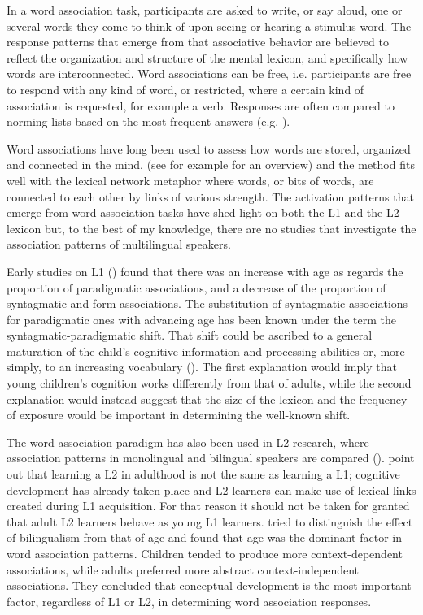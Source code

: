 \documentclass[output=paper,colorlinks,citecolor=brown,nonflat]{langsci/langscibook}
\begin{document}
In a word association task, participants are asked to write, or say aloud, one or several words they come to think of upon seeing or hearing a stimulus word. The response patterns that emerge from that associative behavior are believed to reflect the organization and structure of the mental lexicon, and specifically how words are interconnected. Word associations can be free, i.e. participants are free to respond with any kind of word, or restricted, where a certain kind of association is requested, for example a verb. Responses are often compared to norming lists based on the most frequent answers (e.g. \citealt{PostmanKeppel1970}).

Word associations have long been used to assess how words are stored, organized and connected in the mind, (see for example \citealt{Fitzpatrick2012} for an overview) and the method fits well with the lexical network metaphor where words, or bits of words, are connected to each other by links of various strength. The activation patterns that emerge from word association tasks have shed light on both the L1 and the L2 lexicon but, to the best of my knowledge, there are no studies that investigate the association patterns of multilingual speakers.

Early studies on L1 (\citealt{Ervin1961, EntwisleEtAl1964}) found that there was an increase with age as regards the proportion of paradigmatic associations, and a decrease of the proportion of syntagmatic and form associations. The substitution of syntagmatic associations for paradigmatic ones with advancing age has been known under the term the syntagmatic-paradigmatic shift. That shift could be ascribed to a general maturation of the child’s cognitive information and processing abilities or, more simply, to an increasing vocabulary (\citealt{StolzTiffany1971, CremerEtAl2010}). The first explanation would imply that young children’s cognition works differently from that of adults, while the second explanation would instead suggest that the size of the lexicon and the frequency of exposure would be important in determining the well-known shift.

The word association paradigm has also been used in L2 research, where association patterns in monolingual and bilingual speakers are compared (\citealt{Krzeminska-Adamek2014}). \citet{FitzpatrickIzura2011} point out that learning a L2 in adulthood is not the same as learning a L1; cognitive development has already taken place and L2 learners can make use of lexical links created during L1 acquisition. For that reason it should not be taken for granted that adult L2 learners behave as young L1 learners. \citet{CremerEtAl2010} tried to distinguish the effect of bilingualism from that of age and found that age was the dominant factor in word association patterns. Children tended to produce more context-dependent associations, while adults preferred more abstract context-independent associations. They concluded that conceptual development is the most important factor, regardless of L1 or L2, in determining word association responses.
\end{document}
